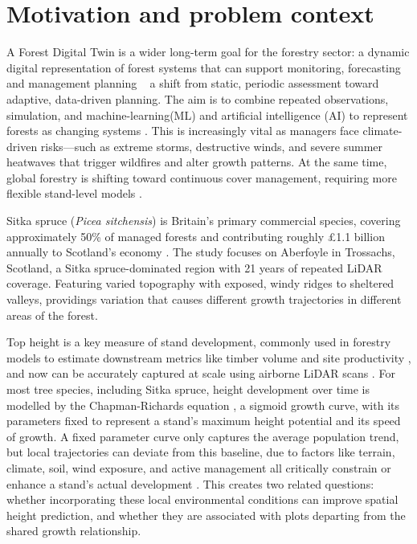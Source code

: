 \documentclass[logo,msc,ai]{infthesis}           %
\begin{document}
\section{Motivation and problem context}
A Forest Digital Twin is a wider long-term goal for the forestry sector: a dynamic digital representation of forest systems that can support monitoring, forecasting and management planning ~ a shift from static, periodic assessment toward adaptive, data-driven planning. The aim is to combine repeated observations, simulation, and machine-learning(ML) and artificial intelligence (AI) to represent forests as changing systems \cite{baskent2026Review_C1_SS, buonocore2022Proposal_C1_SS}. This is increasingly vital as managers face climate-driven risks—such as extreme storms, destructive winds, and severe summer heatwaves that trigger wildfires and alter growth patterns. At the same time, global forestry is shifting toward continuous cover management, requiring more flexible stand-level models \cite{ForestResearch2009Evidence_C1_SS}. 

Sitka spruce (\textit{Picea sitchensis}) is Britain's primary commercial species, covering approximately 50\% of managed forests \cite{ForestResearch2026Sitka_C1_SS} and contributing roughly \pounds1.1 billion annually to Scotland's economy \cite{ScottishForestry2026Future_C1_SS, mason2011Sitka_C1_SS}. The study focuses on Aberfoyle in Trossachs, Scotland, a Sitka spruce-dominated region with 21 years of repeated LiDAR coverage. Featuring varied topography with exposed, windy ridges to sheltered valleys, providings variation that causes different growth trajectories in different areas of the forest. 

Top height is a key measure of stand development, commonly used in forestry models to estimate downstream metrics like timber volume and site productivity \cite{ForestResearch2026Sitka_C1_SS}, and now can be accurately captured at scale using airborne LiDAR scans \cite{suarezminguez2008Practical_C1_SS}. For most tree species, including Sitka spruce, height development over time is modelled by the Chapman-Richards equation \cite{pommerening2015Methods_C2_CR}, a sigmoid growth curve, with its parameters fixed to represent a stand's maximum height potential and its speed of growth. A fixed parameter curve only captures the average population trend, but local trajectories can deviate from this baseline, due to factors like terrain, climate, soil, wind exposure, and active management all critically constrain or enhance a stand's actual development \cite{socha2023Higher_C1_SS, cameron2015Building_C1_SS}. This creates two related questions: whether incorporating these local environmental conditions can improve spatial height prediction, and whether they are associated with plots departing from the shared growth relationship.
\end{document}
